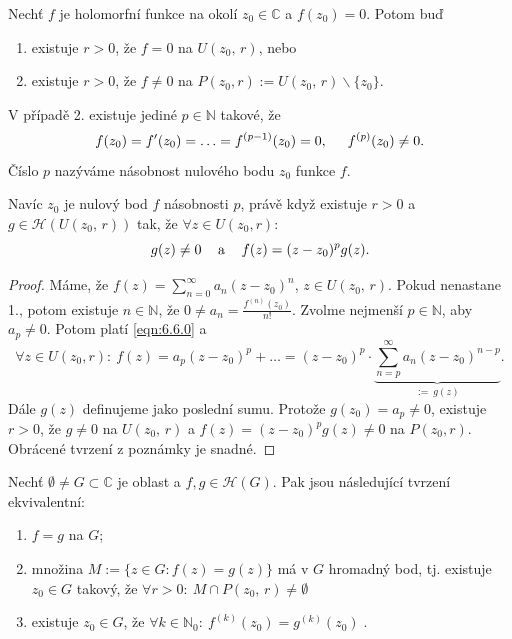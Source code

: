 \begin{theorem}
Nechť $f$ je holomorfní funkce na okolí $z_0 \in \mathbb{C}$ a $f(z_0)=0$. Potom buď
\begin{enumerate}
    \item existuje $r>0$, že $f=0$ na $U(z_0,\,r)$, nebo
    \item existuje $r>0$, že $f\neq 0$ na $P(z_0,r):=U(z_0,\,r)\backslash \{z_0\}$.
\end{enumerate}
V případě 2. existuje jediné $p\in \mathbb{N}$ takové, že 
\begin{equation}
    f(z_0)=f'(z_0)= \ldots = f^{(p-1)}(z_0)=0,\hspace{5mm}
    f^{(p)}(z_0) \neq 0.
    \label{eqn:6.6.0}
\end{equation}
Číslo $p$ nazýváme násobnost nulového bodu $z_0$ funkce $f$.
\end{theorem}

\begin{note}
Navíc $z_0$ je nulový bod $f$ násobnosti $p$, právě když existuje $r>0$ a $g \in \mathcal{H}(U(z_0,\,r))$ tak, že $\forall z \in U(z_0,r)$: 
\begin{equation}
    g(z) \neq 0 \hspace{3mm}\text{ a }\hspace{3mm} f(z)=(z-z_0)^p g(z).
    \label{eqn:6.7.t}
\end{equation}
\end{note}

\begin{proof}
Máme, že $f(z)=\sum\limits _{n=0} ^{\infty} a_n(z-z_0)^n$, $z \in U(z_0,\,r)$. Pokud nenastane 1., potom existuje $n \in \mathbb{N}$, že $0 \neq a_n=\frac{f^{(n)}(z_0)}{n!}$. Zvolme nejmenší $p \in \mathbb{N}$, aby $a_p \neq 0$. Potom platí \cref{eqn:6.6.0} a
\begin{equation}
    \forall z \in U(z_0,r):\ f(z)=a_p(z-z_0)^p + \ldots = (z-z_0)^p \cdot \underset{:=\ g(z)}{\underbrace{\sum\limits_{n=p}^\infty a_n(z-z_0)^{n-p}}}.
\end{equation} 
Dále $g(z)$ definujeme jako poslední sumu. %
Protože $g(z_0)=a_p \neq 0$, existuje $r>0$, že $g \neq 0$ na $U(z_0,\,r)$ a $f(z)=(z-z_0)^pg(z) \neq 0$ na $P(z_0,r)$. Obrácené tvrzení z poznámky je snadné.
\end{proof}

\begin{theorem}
Nechť $\emptyset \neq G \subset \mathbb{C}$ je oblast a $f,g \in \mathcal{H}(G)$. Pak jsou následující tvrzení ekvivalentní:
\begin{enumerate}
\item $f=g$ na $G$;
\item množina $M:=\{z \in G : f(z)=g(z) \}$ má v $G$ hromadný bod, tj. existuje $z_0 \in G$ takový, že $\forall  r>0:\  M \cap P(z_0,\,r) \neq \emptyset  \;$
\item existuje $z_0 \in G$, že $\forall k \in \mathbb{N}_0: \ f^{(k)}(z_0)=g^{(k)}(z_0) \;$.
\end{enumerate}
\end{theorem}

